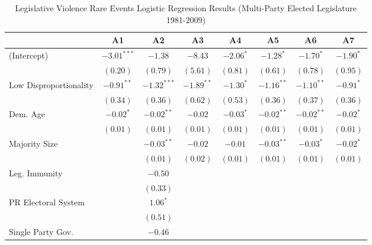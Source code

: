 \documentclass[a4paper]{article}\usepackage[]{graphicx}\usepackage[]{color}
\begin{document}
\begin{table}
\caption{Legislative Violence Rare Events Logistic Regression Results (Multi-Party Elected Legislature 1981-2009)}
\label{outputTable.dem}
\begin{center}

\begin{tabular}{l c c c c c c c }
\hline
                        & A1 & A2 & A3 & A4 & A5 & A6 & A7 \\
\hline
(Intercept)             & $-3.01^{***}$ & $-1.38$       & $-8.43$      & $-2.06^{*}$ & $-1.28^{*}$  & $-1.70^{*}$  & $-1.90^{*}$ \\
                        & $(0.20)$      & $(0.79)$      & $(5.61)$     & $(0.81)$    & $(0.61)$     & $(0.78)$     & $(0.95)$    \\
Low Disproportionality  & $-0.91^{**}$  & $-1.32^{***}$ & $-1.89^{**}$ & $-1.30^{*}$ & $-1.16^{**}$ & $-1.10^{**}$ & $-0.91^{*}$ \\
                        & $(0.34)$      & $(0.36)$      & $(0.62)$     & $(0.53)$    & $(0.36)$     & $(0.37)$     & $(0.36)$    \\
Dem. Age                & $-0.02^{*}$   & $-0.02^{**}$  & $-0.02$      & $-0.03^{*}$ & $-0.02^{**}$ & $-0.02^{**}$ & $-0.02^{*}$ \\
                        & $(0.01)$      & $(0.01)$      & $(0.01)$     & $(0.01)$    & $(0.01)$     & $(0.01)$     & $(0.01)$    \\
Majority Size           &               & $-0.03^{**}$  & $-0.02$      & $-0.01$     & $-0.03^{**}$ & $-0.03^{*}$  & $-0.02^{*}$ \\
                        &               & $(0.01)$      & $(0.02)$     & $(0.01)$    & $(0.01)$     & $(0.01)$     & $(0.01)$    \\
Leg. Immunity           &               & $-0.50$       &              &             &              &              &             \\
                        &               & $(0.33)$      &              &             &              &              &             \\
PR Electoral System     &               & $1.06^{*}$    &              &             &              &              &             \\
                        &               & $(0.51)$      &              &             &              &              &             \\
Single Party Gov.       &               & $-0.46$       &              &             &              &              &             \\

\end{tabular}
\end{center}
\end{table}
\end{document}
